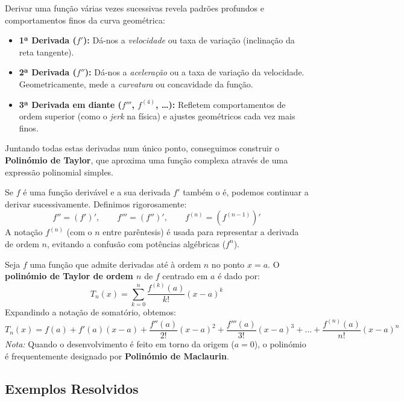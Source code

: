 \begin{notebox}[title={Intuição Geral}]
  Derivar uma função várias vezes sucessivas revela padrões profundos e comportamentos finos da curva geométrica:
  \begin{itemize}
      \item \textbf{1ª Derivada ($f'$):} Dá-nos a \emph{velocidade} ou taxa de variação (inclinação da reta tangente).
      \item \textbf{2ª Derivada ($f''$):} Dá-nos a \emph{aceleração} ou a taxa de variação da velocidade. Geometricamente, mede a \emph{curvatura} ou concavidade da função.
      \item \textbf{3ª Derivada em diante ($f'''$, $f^{(4)}$, \dots):} Refletem comportamentos de ordem superior (como o \emph{jerk} na física) e ajustes geométricos cada vez mais finos.
  \end{itemize}
  Juntando todas estas derivadas num único ponto, conseguimos construir o \textbf{Polinómio de Taylor}, que aproxima uma função complexa através de uma expressão polinomial simples.
\end{notebox}

\begin{defbox}[title={Derivadas Sucessivas}]
  Se $f$ é uma função derivável e a sua derivada $f'$ também o é, podemos continuar a derivar sucessivamente. Definimos rigorosamente:
  \[
    f'' = (f')', \qquad f''' = (f'')', \qquad f^{(n)} = \left(f^{(n-1)}\right)'
  \]
  A notação $f^{(n)}$ (com o $n$ entre parêntesis) é usada para representar a derivada de ordem $n$, evitando a confusão com potências algébricas ($f^n$).
\end{defbox}

\begin{defbox}[title={Polinómio de Taylor}]
  Seja $f$ uma função que admite derivadas até à ordem $n$ no ponto $x=a$. O \textbf{polinómio de Taylor de ordem $n$} de $f$ centrado em $a$ é dado por:
  \[
    T_n(x) = \sum_{k=0}^n \frac{f^{(k)}(a)}{k!}(x-a)^k
  \]
  Expandindo a notação de somatório, obtemos:
  \[
    T_n(x) = f(a) + f'(a)(x-a) + \frac{f''(a)}{2!}(x-a)^2 + \frac{f'''(a)}{3!}(x-a)^3 + \dots + \frac{f^{(n)}(a)}{n!}(x-a)^n
  \]
  \textit{Nota:} Quando o desenvolvimento é feito em torno da origem ($a=0$), o polinómio é frequentemente designado por \textbf{Polinómio de Maclaurin}.
\end{defbox}

\subsection{Exemplos Resolvidos}

